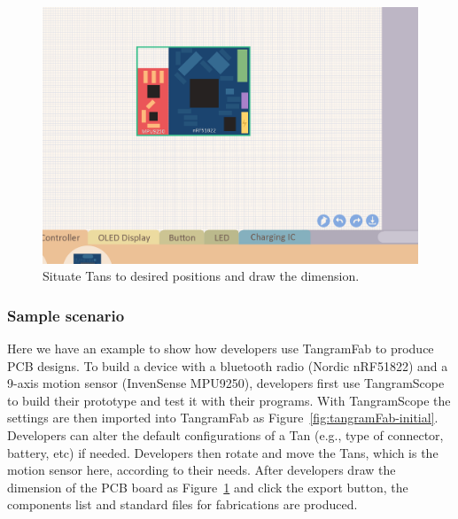 \begin{figure}[!h]
\begin{minipage}[t]{0.47\columnwidth}
    \includegraphics[width=1\textwidth]{image/tan/TangramFab-Final}
    \caption{Situate Tans to desired positions and draw the dimension.}\label{fig:tangramFab-final}
\end{minipage}        
\end{figure}  

\subsubsection{Sample scenario}
Here we have an example to show how developers use TangramFab to produce PCB designs.
To build a device with a bluetooth radio (Nordic nRF51822) and a 9-axis motion sensor (InvenSense MPU9250), developers first use TangramScope to build their prototype and test it with their programs.
With TangramScope the settings are then imported into TangramFab as Figure~\ref{fig:tangramFab-initial}.
Developers can alter the default configurations of a Tan (e.g., type of connector, battery, etc) if needed.
Developers then rotate and move the Tans, which is the motion sensor here, according to their needs.
After developers draw the dimension of the PCB board as Figure~\ref{fig:tangramFab-final} and click the export button, the components list and standard files for fabrications are produced.

